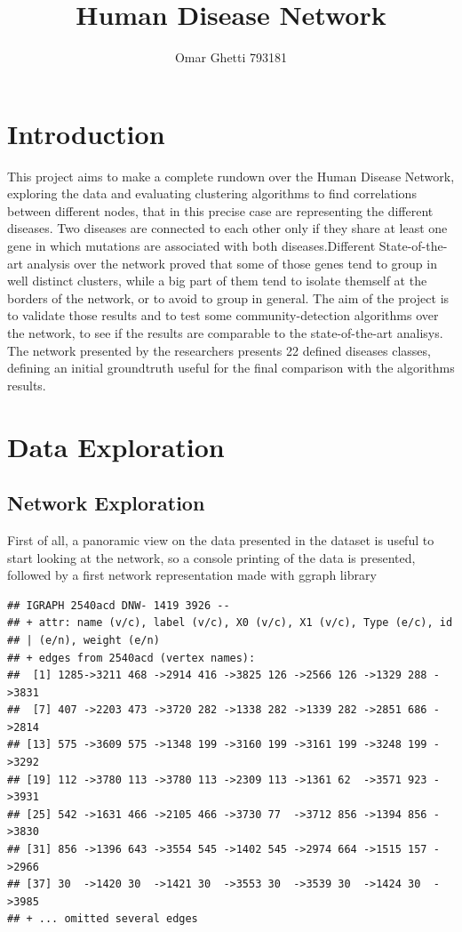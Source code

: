\documentclass[
]{article}
\title{Human Disease Network}
\author{Omar Ghetti 793181}
\date{}
\begin{document}
\maketitle



{
\setcounter{tocdepth}{2}
\tableofcontents
}
\hypertarget{introduction}{%
\section{Introduction}\label{introduction}}

This project aims to make a complete rundown over the Human Disease Network, exploring the data and evaluating clustering algorithms to find correlations between different nodes, that in this precise case are representing the different diseases.
Two diseases are connected to each other only if they share at least one gene in which mutations are associated with both diseases.Different State-of-the-art analysis over the network proved that some of those genes tend to group in well distinct clusters, while a big part of them tend to isolate themself at the borders of the network, or to avoid to group in general. The aim of the project is to validate those results and to test some community-detection algorithms over the network, to see if the results are comparable to the state-of-the-art analisys.
The network presented by the researchers presents 22 defined diseases classes, defining an initial groundtruth useful for the final comparison with the algorithms results.

\hypertarget{data-exploration}{%
\section{Data Exploration}\label{data-exploration}}

\hypertarget{network-exploration}{%
\subsection{Network Exploration}\label{network-exploration}}

First of all, a panoramic view on the data presented in the dataset is useful to start looking at the network, so a console printing of the data is presented, followed by a first network representation made with ggraph library

\begin{verbatim}
## IGRAPH 2540acd DNW- 1419 3926 -- 
## + attr: name (v/c), label (v/c), X0 (v/c), X1 (v/c), Type (e/c), id
## | (e/n), weight (e/n)
## + edges from 2540acd (vertex names):
##  [1] 1285->3211 468 ->2914 416 ->3825 126 ->2566 126 ->1329 288 ->3831
##  [7] 407 ->2203 473 ->3720 282 ->1338 282 ->1339 282 ->2851 686 ->2814
## [13] 575 ->3609 575 ->1348 199 ->3160 199 ->3161 199 ->3248 199 ->3292
## [19] 112 ->3780 113 ->3780 113 ->2309 113 ->1361 62  ->3571 923 ->3931
## [25] 542 ->1631 466 ->2105 466 ->3730 77  ->3712 856 ->1394 856 ->3830
## [31] 856 ->1396 643 ->3554 545 ->1402 545 ->2974 664 ->1515 157 ->2966
## [37] 30  ->1420 30  ->1421 30  ->3553 30  ->3539 30  ->1424 30  ->3985
## + ... omitted several edges
\end{verbatim}
\end{document}
